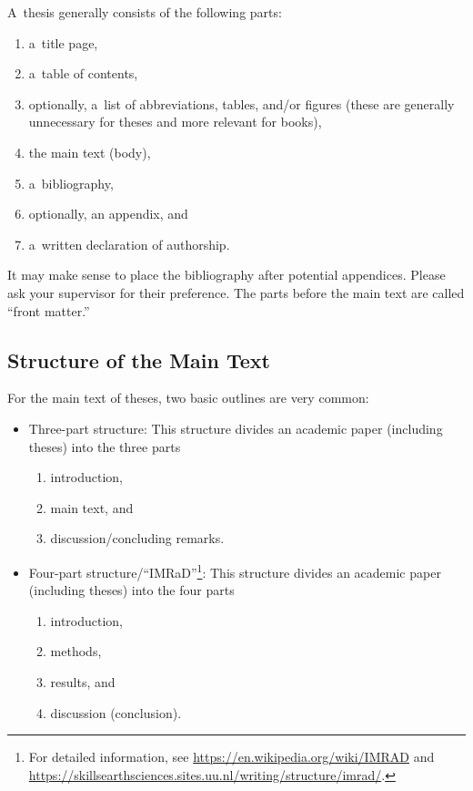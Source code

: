 \documentclass[11pt, a4paper, oneside]{article}
\theoremstyle{Plain}
\theoremstyle{Definition}
\theoremstyle{Remark}
\begin{document}
A~thesis generally consists of the following parts:
\begin{enumerate}
	\item a~title page,
	\item a~table of contents,
	\item optionally, a~list of abbreviations, tables, and/or figures (these are generally unnecessary for theses and more relevant for books),
	\item the main text (body),
	\item a~bibliography,
	\item optionally, an appendix, and
	\item a~written declaration of authorship.
\end{enumerate}
It may make sense to place the bibliography after potential appendices. Please ask your supervisor for their preference. The parts before the main text are called ``front matter.''

\subsection{Structure of the Main Text}

For the main text of theses, two basic outlines are very common:
\begin{itemize}
	\item Three-part structure: This structure divides an academic paper (including theses) into the three parts
		\begin{enumerate}
			\item introduction,
			\item main text, and
			\item discussion/concluding remarks.
		\end{enumerate}
	\item Four-part structure/``IMRaD''\footnote{For detailed information, see \url{https://en.wikipedia.org/wiki/IMRAD} and \url{https://skillsearthsciences.sites.uu.nl/writing/structure/imrad/}.}: This structure divides an academic paper (including theses) into the four parts
		\begin{enumerate}
			\item introduction,
			\item methods,
			\item results, and
			\item discussion (conclusion).
		\end{enumerate}
\end{itemize}
\end{document}
